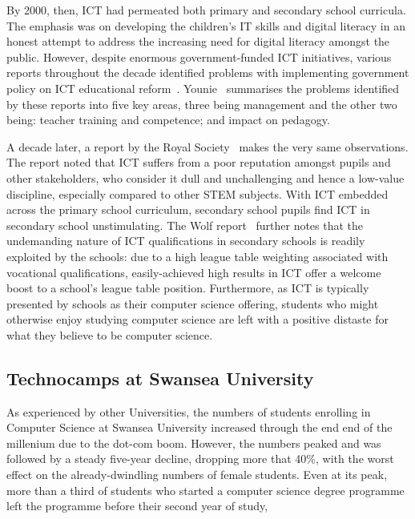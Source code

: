 \documentclass{sig-alternate}
\begin{document}
By 2000, then, ICT had permeated both primary and secondary school
curricula.  The emphasis was on developing the children's IT skills
and digital literacy in an honest attempt to address the increasing
need for digital literacy amongst the public.  However, despite
enormous government-funded ICT initiatives, various reports throughout
the decade identified problems with implementing government policy on
ICT educational
reform~\cite{OpieFukuyo:2000,Ofsted:2001,Ofsted:2002,Ofsted:2004,
Loveless:2005}.  Younie~\cite{Younie:2006} summarises the problems
identified by these reports into five key areas, three being
management and the other two being: teacher training and competence;
and impact on pedagogy.

A decade later, a report by the Royal Society~\cite{RoyalSoc:2012}
makes the very same observations.  The report noted that ICT suffers
from a poor reputation amongst pupils and other stakeholders, who
consider it dull and unchallenging and hence a low-value discipline,
especially compared to other STEM subjects.  With ICT embedded across
the primary school curriculum, secondary school pupils find ICT in
secondary school unstimulating.  The Wolf report~\cite{Wolf:2011}
further notes that the undemanding nature of ICT qualifications in
secondary schools is readily exploited by the schools: due to a high
league table weighting associated with vocational qualifications,
easily-achieved high results in ICT offer a welcome boost to a
school's league table position.  Furthermore, as ICT is typically
presented by schools as their computer science offering, students who
might otherwise enjoy studying computer science are left with a
positive distaste for what they believe to be computer science.

\subsection{Technocamps at Swansea University}
As experienced by other Universities,
the numbers of students enrolling in Computer Science
at Swansea University increased through the end end
of the millenium due to the dot-com boom.
However, the numbers peaked and was followed by
a steady five-year decline, dropping more that 40\%,
with the worst effect on the already-dwindling numbers
of female students.
Even at its peak, more than a third of students who
started a computer science degree programme left
the programme before their second year of study,


\end{document}
